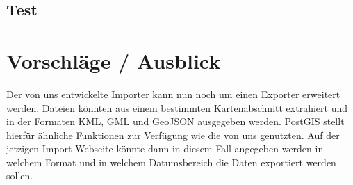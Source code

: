 \documentclass[]{article}
\begin{document}
\subsection{Test}


\section{Vorschläge / Ausblick}
Der von uns entwickelte Importer kann nun noch um einen Exporter erweitert werden. Dateien könnten aus einem bestimmten Kartenabschnitt extrahiert und in der Formaten KML, GML und GeoJSON ausgegeben werden. PostGIS stellt hierfür ähnliche Funktionen zur Verfügung wie die von uns genutzten. Auf der jetzigen Import-Webseite könnte dann in diesem Fall angegeben werden in welchem Format und in welchem Datumsbereich die Daten exportiert werden sollen.
\end{document}
